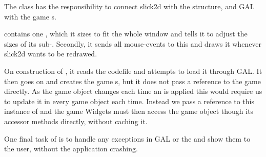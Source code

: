 The class  has the responsibility to connect slick2d with the  structure, and GAL with the game s.

 contains one , which it sizes to fit the whole window and tells it to adjust the sizes of its sub-. Secondly, it sends all mouse-events to this  and draws it whenever slick2d wants to be redrawed.

On construction of , it reads the \productname codefile and attempts to load it through GAL. It then goes on and creates the game s, but it does not pass a reference to the game directly. As the game object changes each time an  is applied this would require us to update it in every game object each time. Instead we pass a reference to this instance of  and the game Widgets must then access the game 
object though its accessor methods directly, without caching it.

One final task of  is to handle any exceptions in GAL or the  and show them to the user, without the application crashing.
